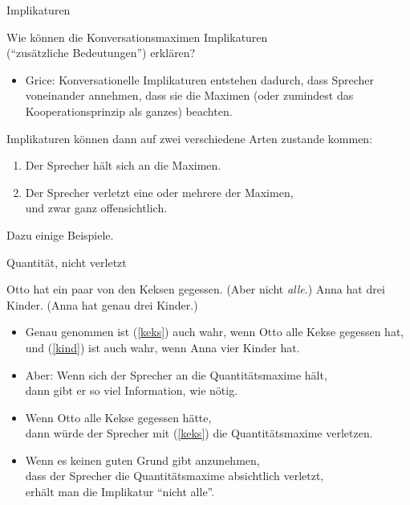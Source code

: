 \begin{frame}{Implikaturen}

Wie können die Konversationsmaximen Implikaturen\\ ("`zusätzliche Bedeutungen"') erklären?

\begin{itemize}
\item Grice: Konversationelle Implikaturen entstehen dadurch, dass Sprecher voneinander annehmen, dass sie die Maximen (oder zumindest das Kooperationsprinzip als ganzes) beachten.
\end{itemize}\pause

Implikaturen können dann auf zwei verschiedene Arten zustande kommen:

\begin{enumerate}
\item Der Sprecher hält sich an die Maximen.\pause
\item Der Sprecher verletzt eine oder mehrere der Maximen,\\ und zwar ganz offensichtlich.\pause
\end{enumerate}

Dazu einige Beispiele.

\end{frame}



\begin{frame}{Quantität, nicht verletzt}

 \begin{exe}
  \ex Otto hat ein paar von den Keksen gegessen. (\alert{Aber nicht \textit{alle}.})\label{keks}
  \ex Anna hat drei Kinder. (\alert{Anna hat genau drei Kinder.})\label{kind}
\end{exe}


\begin{itemize}
\item Genau genommen ist (\ref{keks}) auch wahr, wenn Otto alle Kekse gegessen hat, und  (\ref{kind}) ist auch wahr, wenn Anna vier Kinder hat.\pause
\item Aber: Wenn sich der Sprecher an die Quantitätsmaxime hält,\\ dann gibt er so viel Information, wie nötig.\pause
\item Wenn Otto alle Kekse gegessen hätte,\\ dann würde der Sprecher mit (\ref{keks}) die Quantitätsmaxime verletzen.\pause
\item Wenn es keinen guten Grund gibt anzunehmen,\\ dass der Sprecher die Quantitätsmaxime absichtlich verletzt,\\ erhält man die Implikatur "`nicht alle"'.
\end{itemize}


\end{frame}



